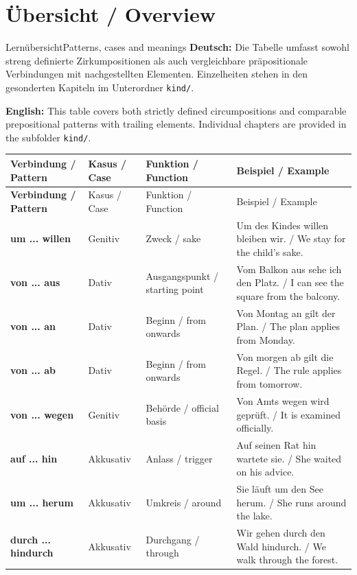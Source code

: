 \documentclass[a4paper,11pt]{article}
\newcommand{\GermanText}[1]{\textbf{Deutsch: }#1\par}
\newcommand{\EnglishText}[1]{{\small\color{SoftGray}\textbf{English: }#1\par}}
\begin{document}
\section{Übersicht / Overview}
\begin{grammarentry}{Lernübersicht}{Patterns, cases and meanings}
\GermanText{Die Tabelle umfasst sowohl streng definierte Zirkumpositionen als auch vergleichbare präpositionale Verbindungen mit nachgestellten Elementen. Einzelheiten stehen in den gesonderten Kapiteln im Unterordner \texttt{kind/}.}
\EnglishText{This table covers both strictly defined circumpositions and comparable prepositional patterns with trailing elements. Individual chapters are provided in the subfolder \texttt{kind/}.}
\end{grammarentry}
{\small
{}
\begin{longtable}{>{\bfseries}p{3.0cm}p{1.5cm}p{3.2cm}p{5.9cm}}
\rowcolor{HeaderBlueDark}
\color{white}Verbindung / Pattern & \color{white}Kasus / Case & \color{white}Funktion / Function & \color{white}Beispiel / Example \\
\endfirsthead
\rowcolor{HeaderBlueDark}
\color{white}Verbindung / Pattern & \color{white}Kasus / Case & \color{white}Funktion / Function & \color{white}Beispiel / Example \\
\endhead
um ... willen & Genitiv & Zweck / sake & Um des Kindes willen bleiben wir. / We stay for the child's sake. \\
von ... aus & Dativ & Ausgangspunkt / starting point & Vom Balkon aus sehe ich den Platz. / I can see the square from the balcony. \\
von ... an & Dativ & Beginn / from onwards & Von Montag an gilt der Plan. / The plan applies from Monday. \\
von ... ab & Dativ & Beginn / from onwards & Von morgen ab gilt die Regel. / The rule applies from tomorrow. \\
von ... wegen & Genitiv & Behörde / official basis & Von Amts wegen wird geprüft. / It is examined officially. \\
auf ... hin & Akkusativ & Anlass / trigger & Auf seinen Rat hin wartete sie. / She waited on his advice. \\
um ... herum & Akkusativ & Umkreis / around & Sie läuft um den See herum. / She runs around the lake. \\
durch ... hindurch & Akkusativ & Durchgang / through & Wir gehen durch den Wald hindurch. / We walk through the forest. \\

\end{longtable}}
\end{document}
